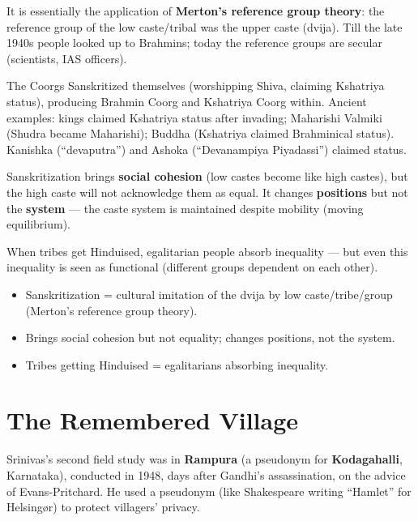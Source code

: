 It is essentially the application of \textbf{Merton's reference group theory}: the reference group of the low caste/tribal was the upper caste (dvija). Till the late 1940s people looked up to Brahmins; today the reference groups are secular (scientists, IAS officers).

\begin{ExampleBox}
The Coorgs Sanskritized themselves (worshipping Shiva, claiming Kshatriya status), producing Brahmin Coorg and Kshatriya Coorg within. Ancient examples: kings claimed Kshatriya status after invading; Maharishi Valmiki (Shudra became Maharishi); Buddha (Kshatriya claimed Brahminical status). Kanishka (``devaputra'') and Ashoka (``Devanampiya Piyadassi'') claimed status.
\end{ExampleBox}

\begin{CriticalPoint}
Sanskritization brings \textbf{social cohesion} (low castes become like high castes), but the high caste will not acknowledge them as equal. It changes \textbf{positions} but not the \textbf{system} --- the caste system is maintained despite mobility (moving equilibrium).
\end{CriticalPoint}

When tribes get Hinduised, egalitarian people absorb inequality --- but even this inequality is seen as functional (different groups dependent on each other).

\begin{QuickRevision}
\begin{itemize}
\item Sanskritization = cultural imitation of the dvija by low caste/tribe/group (Merton's reference group theory).
\item Brings social cohesion but not equality; changes positions, not the system.
\item Tribes getting Hinduised = egalitarians absorbing inequality.
\end{itemize}
\end{QuickRevision}

\section{The Remembered Village}

Srinivas's second field study was in \textbf{Rampura} (a pseudonym for \textbf{Kodagahalli}, Karnataka), conducted in 1948, days after Gandhi's assassination, on the advice of Evans-Pritchard. He used a pseudonym (like Shakespeare writing ``Hamlet'' for Helsing\o r) to protect villagers' privacy.

